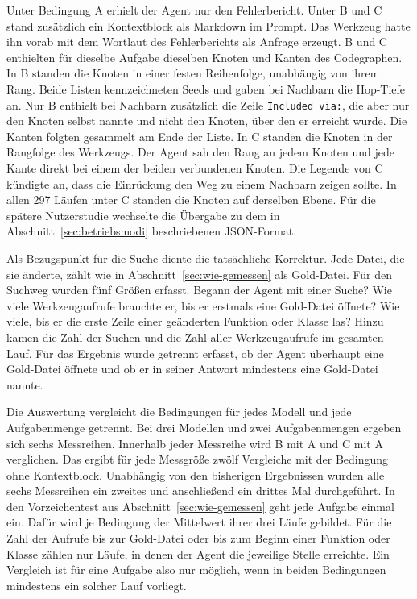 \begin{ungelesen}
{Unter Bedingung A erhielt der Agent nur den Fehlerbericht. Unter B und C stand zusätzlich ein Kontextblock als Markdown im Prompt. Das Werkzeug hatte ihn vorab mit dem Wortlaut des Fehlerberichts als Anfrage erzeugt. B und C enthielten für dieselbe Aufgabe dieselben Knoten und Kanten des Codegraphen. In B standen die Knoten in einer festen Reihenfolge, unabhängig von ihrem Rang. Beide Listen kennzeichneten Seeds und gaben bei Nachbarn die Hop-Tiefe an. Nur B enthielt bei Nachbarn zusätzlich die Zeile \texttt{Included via:}, die aber nur den Knoten selbst nannte und nicht den Knoten, über den er erreicht wurde. Die Kanten folgten gesammelt am Ende der Liste. In C standen die Knoten in der Rangfolge des Werkzeugs. Der Agent sah den Rang an jedem Knoten und jede Kante direkt bei einem der beiden verbundenen Knoten. Die Legende von C kündigte an, dass die Einrückung den Weg zu einem Nachbarn zeigen sollte. In allen 297 Läufen unter C standen die Knoten auf derselben Ebene. Für die spätere Nutzerstudie wechselte die Übergabe zu dem in Abschnitt~\ref{sec:betriebsmodi} beschriebenen JSON-Format.

Als Bezugspunkt für die Suche diente die tatsächliche Korrektur. Jede Datei, die sie änderte, zählt wie in Abschnitt~\ref{sec:wie-gemessen} als Gold-Datei. Für den Suchweg wurden fünf Größen erfasst. Begann der Agent mit einer Suche? Wie viele Werkzeugaufrufe brauchte er, bis er erstmals eine Gold-Datei öffnete? Wie viele, bis er die erste Zeile einer geänderten Funktion oder Klasse las? Hinzu kamen die Zahl der Suchen und die Zahl aller Werkzeugaufrufe im gesamten Lauf. Für das Ergebnis wurde getrennt erfasst, ob der Agent überhaupt eine Gold-Datei öffnete und ob er in seiner Antwort mindestens eine Gold-Datei nannte.

Die Auswertung vergleicht die Bedingungen für jedes Modell und jede Aufgabenmenge getrennt. Bei drei Modellen und zwei Aufgabenmengen ergeben sich sechs Messreihen. Innerhalb jeder Messreihe wird B mit A und C mit A verglichen. Das ergibt für jede Messgröße zwölf Vergleiche mit der Bedingung ohne Kontextblock. Unabhängig von den bisherigen Ergebnissen wurden alle sechs Messreihen ein zweites und anschließend ein drittes Mal durchgeführt. In den Vorzeichentest aus Abschnitt~\ref{sec:wie-gemessen} geht jede Aufgabe einmal ein. Dafür wird je Bedingung der Mittelwert ihrer drei Läufe gebildet. Für die Zahl der Aufrufe bis zur Gold-Datei oder bis zum Beginn einer Funktion oder Klasse zählen nur Läufe, in denen der Agent die jeweilige Stelle erreichte. Ein Vergleich ist für eine Aufgabe also nur möglich, wenn in beiden Bedingungen mindestens ein solcher Lauf vorliegt.

}
\end{ungelesen}
